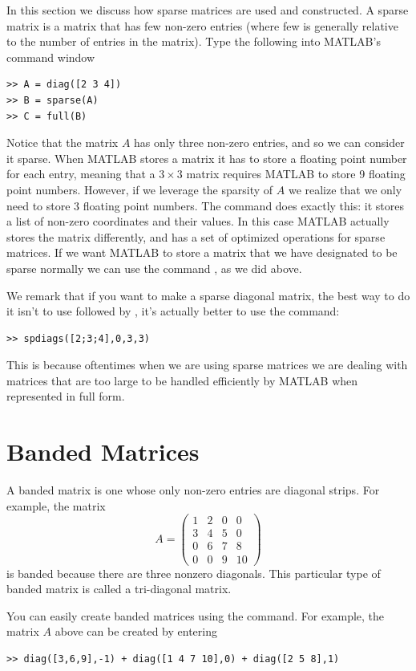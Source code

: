 In this section we discuss how sparse matrices are used and constructed. A sparse matrix is a matrix that has few non-zero entries (where few is generally relative to the number of entries in the matrix). Type the following into MATLAB's command window
\begin{lstlisting}[style=matlab]
>> A = diag([2 3 4])
>> B = sparse(A)
>> C = full(B)
\end{lstlisting}
Notice that the matrix $A$ has only three non-zero entries, and so we can consider it sparse. When MATLAB stores a matrix it has to store a floating point number for each entry, meaning that a $3 \times 3$ matrix requires MATLAB to store 9 floating point numbers. However, if we leverage the sparsity of $A$ we realize that we only need to store 3 floating point numbers. The  command does exactly this: it stores a list of non-zero coordinates and their values. In this case MATLAB actually stores the matrix differently, and has a set of optimized operations for sparse matrices. If we want MATLAB to store a matrix that we have designated to be sparse normally we can use the command , as we did above.


We remark that if you want to make a sparse diagonal matrix, the
best way to do it isn't to use  followed by ,
it's actually better to use the  command:
\begin{lstlisting}[style=matlab]
>> spdiags([2;3;4],0,3,3)
\end{lstlisting}

This is because oftentimes when we are using sparse matrices we are dealing with matrices that are too large to be handled efficiently by MATLAB when represented in full form.

\section*{Banded Matrices}

A banded matrix is one whose only non-zero entries are diagonal
strips.  For example, the matrix
\[
A = \begin{pmatrix} 1&2&0&0\\3&4&5&0\\0&6&7&8\\0&0&9&10
\end{pmatrix}
\]
is banded because there are three nonzero diagonals.  This
particular type of banded matrix is called a tri-diagonal matrix.

You can easily create banded matrices using the  command.  For example, the matrix $A$ above can be created by
entering
\begin{lstlisting}[style=matlab]
>> diag([3,6,9],-1) + diag([1 4 7 10],0) + diag([2 5 8],1)
\end{lstlisting}

